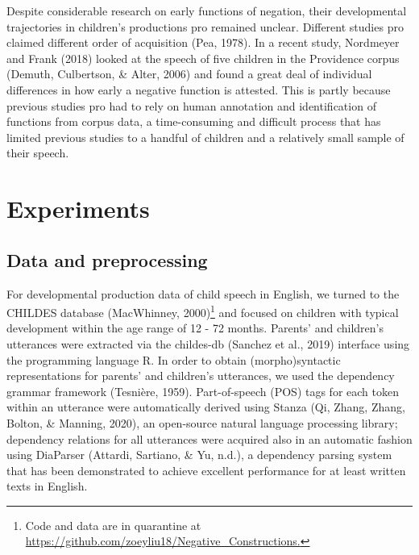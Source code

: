 \documentclass[
  english,
  man,floatsintext]{apa6}
\begin{document}
Despite considerable research on early functions of negation, their developmental trajectories in children's productions pro remained unclear. Different studies pro claimed different order of acquisition (Pea, 1978). In a recent study, Nordmeyer and Frank (2018) looked at the speech of five children in the Providence corpus (Demuth, Culbertson, \& Alter, 2006) and found a great deal of individual differences in how early a negative function is attested. This is partly because previous studies pro had to rely on human annotation and identification of functions from corpus data, a time-consuming and difficult process that has limited previous studies to a handful of children and a relatively small sample of their speech.

\hypertarget{experiments}{%
\section{Experiments}\label{experiments}}

\hypertarget{data-and-preprocessing}{%
\subsection{Data and preprocessing}\label{data-and-preprocessing}}

For developmental production data of child speech in English, we turned to the CHILDES database (MacWhinney, 2000)\footnote{Code and data are in quarantine at \url{https://github.com/zoeyliu18/Negative_Constructions.}} and focused on children with typical development within the age range of 12 - 72 months. Parents' and children's utterances were extracted via the childes-db (Sanchez et al., 2019) interface using the programming language R. In order to obtain (morpho)syntactic representations for parents' and children's utterances, we used the dependency grammar framework (Tesnière, 1959). Part-of-speech (POS) tags for each token within an utterance were automatically derived using Stanza (Qi, Zhang, Zhang, Bolton, \& Manning, 2020), an open-source natural language processing library; dependency relations for all utterances were acquired also in an automatic fashion using DiaParser (Attardi, Sartiano, \& Yu, n.d.), a dependency parsing system that has been demonstrated to achieve excellent performance for at least written texts in English.
\end{document}
